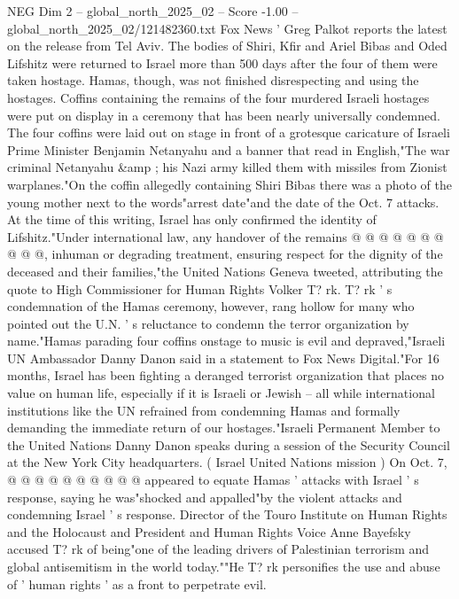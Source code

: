 \begin{textsample}{NEG Dim 2 – global\_north\_2025\_02 – Score -1.00 – global\_north\_2025\_02/121482360.txt}  \label{ex:f2_neg_009}
Fox News ' Greg Palkot reports the latest on the release from Tel Aviv.
The bodies of Shiri, Kfir and Ariel Bibas and Oded Lifshitz were returned to Israel more than 500 days after the four of them were taken hostage.
Hamas, though, was not finished disrespecting and using the hostages.
Coffins containing the remains of the four murdered Israeli hostages were put on display in a ceremony that has been nearly universally condemned.
The four coffins were laid out on stage in front of a grotesque caricature of Israeli Prime Minister Benjamin Netanyahu and a banner that read in English,"The war criminal Netanyahu \&amp ; his Nazi army killed them with missiles from Zionist warplanes."On the coffin allegedly containing Shiri Bibas there was a photo of the young mother next to the words"arrest date"and the date of the Oct. 7 attacks.
At the time of this writing, Israel has only confirmed the identity of Lifshitz."Under international law, any handover of the remains @ @ @ @ @ @ @ @ @ @, inhuman or degrading treatment, ensuring respect for the dignity of the deceased and their families,"the United Nations Geneva tweeted, attributing the quote to High Commissioner for Human Rights Volker T? rk.
T? rk ' s condemnation of the Hamas ceremony, however, rang hollow for many who pointed out the U.N. ' s reluctance to condemn the terror organization by name."Hamas parading four coffins onstage to music is evil and depraved,"Israeli UN Ambassador Danny Danon said in a statement to Fox News Digital."For 16 months, Israel has been fighting a deranged terrorist organization that places no value on human life, especially if it is Israeli or Jewish -- all while international institutions like the UN refrained from condemning Hamas and formally demanding the immediate return of our hostages."Israeli Permanent Member to the United Nations Danny Danon speaks during a session of the Security Council at the New York City headquarters. ( Israel United Nations mission ) On Oct. 7, @ @ @ @ @ @ @ @ @ @ appeared to equate Hamas ' attacks with Israel ' s response, saying he was"shocked and appalled"by the violent attacks and condemning Israel ' s response.
Director of the Touro Institute on Human Rights and the Holocaust and President and Human Rights Voice Anne Bayefsky accused T? rk of being"one of the leading drivers of Palestinian terrorism and global antisemitism in the world today.""He T? rk personifies the use and abuse of ' human rights ' as a front to perpetrate evil.

\end{textsample}
